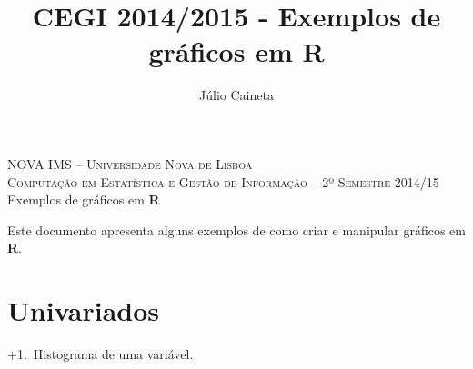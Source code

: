 \documentclass{article}\usepackage[]{graphicx}\usepackage[]{color}
\author{Júlio Caineta}
\title{CEGI 2014/2015 - Exemplos de gráficos em R}
\newcounter{graph}[section]
\renewcommand{\thegraph}{\number\numexpr\value{graph}+1\relax.~\stepcounter{graph}}
\begin{document}
\begin{center}
\textsc {\small NOVA IMS -- Universidade Nova de Lisboa} \\
\textsc {Computação em Estatística e Gestão de Informação -- 2º Semestre 2014/15}
\vspace{5mm} \\
{\large Exemplos de gráficos em \textbf{R}}
\end{center}

\vspace{5mm}

Este documento apresenta alguns exemplos de como criar e manipular gráficos em \textbf{R}.


\section{Univariados}

\thegraph Histograma de uma variável.
\end{document}
